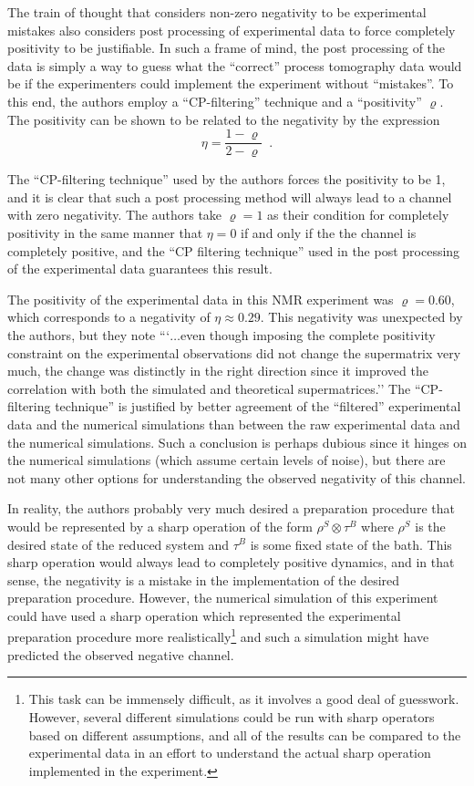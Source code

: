 The train of thought that considers non-zero negativity to be experimental mistakes also considers post processing of experimental data to force completely positivity to be justifiable.  In such a frame of mind, the post processing of the data is simply a way to guess what the ``correct'' process tomography data would be if the experimenters could implement the experiment without ``mistakes''.  To this end, the authors employ a ``CP-filtering'' technique \cite{Havel2003} and a ``positivity'' $\varrho$.  The positivity can be shown to be related to the negativity by the expression 
$$
\eta = \frac{1 - \varrho}{2 - \varrho}\;\;.
$$

The ``CP-filtering technique'' used by the authors forces the positivity to be 1, and it is clear that such a post processing method will always lead to a channel with zero negativity.  The authors take $\varrho=1$ as their condition for completely positivity in the same manner that $\eta=0$ if and only if the the channel is completely positive, and the ``CP filtering technique'' used in the post processing of the experimental data guarantees this result.

The positivity of the experimental data in this NMR experiment was $\varrho=0.60$, which corresponds to a negativity of $\eta\approx 0.29$.  This negativity was unexpected by the authors, but they note ```$\ldots$even though imposing the complete positivity constraint on the experimental observations did not change the supermatrix very much, the change was distinctly in the right direction since it improved the correlation with both the simulated and theoretical supermatrices.''  The ``CP-filtering technique'' is justified by better agreement of the ``filtered'' experimental data and the numerical simulations than between the raw experimental data and the numerical simulations.  Such a conclusion is perhaps dubious since it hinges on the numerical simulations (which assume certain levels of noise), but there are not many other options for understanding the observed negativity of this channel.

In reality, the authors probably very much desired a preparation procedure that would be represented by a sharp operation of the form $\rho^S\otimes\tau^B$ where $\rho^S$ is the desired state of the reduced system and $\tau^B$ is some fixed state of the bath.  This sharp operation would always lead to completely positive dynamics, and in that sense, the negativity is a mistake in the implementation of the desired preparation procedure.  However, the numerical simulation of this experiment could have used a sharp operation which represented the experimental preparation procedure more realistically\footnote{This task can be immensely difficult, as it involves a good deal of guesswork.  However, several different simulations could be run with sharp operators based on different assumptions, and all of the results can be compared to the experimental data in an effort to understand the actual sharp operation implemented in the experiment.} and such a simulation might have predicted the observed negative channel.  

